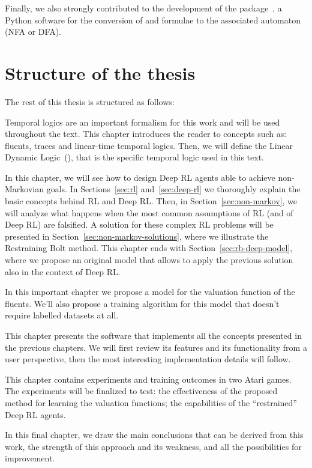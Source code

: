 Finally, we also strongly contributed to the development of the 
package~\cite{bib:flloat}, a Python software for the conversion of \ltl{} and
\ldl{} formulae to the associated automaton (NFA or DFA).


\section{Structure of the thesis}

The rest of this thesis is structured as follows:
\begin{description}[style=nextline]
	\item[\ref{ch:logics}~--~\nameref{ch:logics}]
		Temporal logics are an important formalism for this work and will be used
		throughout the text. This chapter introduces the reader to concepts such
		as: fluents, traces and linear-time temporal logics. Then, we will define
		the Linear Dynamic Logic~(\ldl{}), that is the specific temporal logic
		used in this text.
	\item[\ref{ch:rl}~--~\nameref{ch:rl}]
		In this chapter, we will see how to design Deep RL agents able to achieve
		non-Markovian goals. In Sections~\ref{sec:rl} and~\ref{sec:deep-rl} we
		thoroughly explain the basic concepts behind RL and Deep RL. Then, in
		Section~\ref{sec:non-markov}, we will analyze what happens when the most
		common assumptions of RL (and of Deep RL) are falsified.  A solution for
		these complex RL problems will be presented in
		Section~\ref{sec:non-markov-solutions}, where we illustrate the
		Restraining Bolt method.  This chapter ends with
		Section~\ref{sec:rb-deep-model}, where we propose an original model that
		allows to apply the previous solution also in the context of Deep RL.
	\item[\ref{ch:fluents}~--~\nameref{ch:fluents}]
		In this important chapter we propose a model for the valuation function
		of the fluents. We'll also propose a training algorithm for this model
		that doesn't require labelled datasets at all.
	\item[\ref{ch:atarieyes}~--~\nameref{ch:atarieyes}]
		This chapter presents the software that implements all the concepts
		presented in the previous chapters. We will first review its features and
		its functionality from a user perspective, then the most interesting
		implementation details will follow.
	\item[\ref{ch:experiments}~--~\nameref{ch:experiments}]
		This chapter contains experiments and training outcomes in two Atari
		games. The experiments will be finalized to test: the effectiveness of the
		proposed method for learning the valuation functions; the capabilities of
		the ``restrained'' Deep RL agents.
	\item[\ref{ch:conclusions}~--~\nameref{ch:conclusions}]
		In this final chapter, we draw the main conclusions that can be derived
		from this work, the strength of this approach and its weakness, and all
		the possibilities for improvement.
\end{description}

